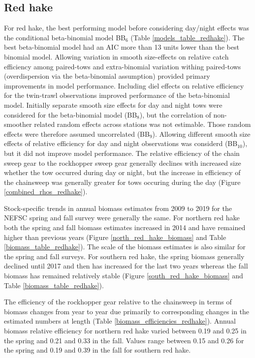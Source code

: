 \documentclass[]{article}
\begin{document}
\hypertarget{red-hake}{%
\subsection{Red hake}\label{red-hake}}

For red hake, the best performing model before considering day/night
effects was the conditional beta-binomial model BB\(_6\) (Table
\ref{models_table_redhake}). The best beta-binomial model had an AIC
more than 13 units lower than the best binomial model. Allowing
variation in smooth size-effects on relative catch efficiency among
paired-tows and extra-binomial variation withing paired-tows
(overdispersion via the beta-binomial assumption) provided primary
improvements in model performance. Including diel effects on relative
efficiency for the twin-trawl observations improved performance of the
beta-binomial model. Initially separate smooth size effects for day and
night tows were considered for the beta-binomial model (BB\(_8\)), but
the correlation of non-smoother related random effects across stations
was not estimable. Those random effects were therefore assumed
uncorrelated (BB\(_9\)). Allowing different smooth size effects of
relative efficiency for day and night observations was considerd
(BB\(_{10}\)), but it did not improve model performance. The relative
efficiency of the chain sweep gear to the rockhopper sweep gear
generally declines with increased size whether the tow occurred during
day or night, but the increase in efficiency of the chainsweep was
generally greater for tows occuring during the day (Figure
\ref{combined_rhos_redhake}).

Stock-specific trends in annual biomass estimates from 2009 to 2019 for
the NEFSC spring and fall survey were generally the same. For northern
red hake both the spring and fall biomass estimates increased in 2014
and have remained higher than previous years (Figure
\ref{north_red_hake_biomass} and Table \ref{biomass_table_redhake}). The
scale of the biomass estimates is also similar for the spring and fall
surveys. For southern red hake, the spring biomass generally declined
until 2017 and then has increased for the last two years whereas the
fall biomass has remained relatively stable (Figure
\ref{south_red_hake_biomass} and Table \ref{biomass_table_redhake}).

The efficiency of the rockhopper gear relative to the chainsweep in
terms of biomass changes from year to year due primarily to
corresponding changes in the estimated numbers at length (Table
\ref{biomass_efficiencies_redhake}). Annual biomass relative efficiency
for northern red hake varied between 0.19 and 0.25 in the spring and
0.21 and 0.33 in the fall. Values range between 0.15 and 0.26 for the
spring and 0.19 and 0.39 in the fall for southern red hake.
\end{document}
